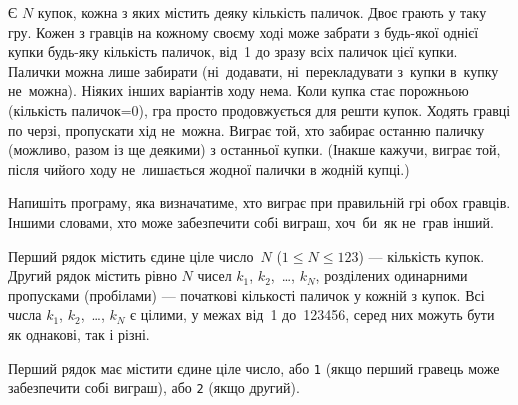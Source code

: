﻿Є $N$ купок, кожна з яких містить деяку кількість паличок.
Двоє грають у таку гру.
Кожен з гравців на кожному своєму ході може забрати з будь-якої однієї купки будь-яку кількість паличок, від~1 до зразу всіх паличок цієї купки. Палички можна лише забирати (ні~додавати, ні~перекладувати з~купки в~купку не~можна).
Ніяких інших варіантів ходу нема. 
Коли купка стає порожньою (кількість паличок=0), гра просто продовжується для решти купок.
Ходять гравці по черзі, пропускати хід не~можна.
Виграє той, хто забирає останню паличку (можливо, разом із ще деякими) з останньої купки.
(Інакше кажучи, виграє той, після чийого ходу не~лишається жодної палички в жодній купці.)

Напишіть програму, яка визначатиме, хто виграє при правильній грі обох гравців. 
Іншими словами, хто може забезпечити собі виграш, хоч~би~як не~грав інший.

\InputFile
Перший рядок містить єдине ціле число~$N$ ($1\leqslant N\leqslant 123$) --- кількість купок.
Др{\it у}гий рядок містить рівно $N$ чисел $k_1$, $k_2$,~\dots, $k_N$, розділених одинарними пропусками (пробілами) --- початкові кількості паличок у кожній з купок. Всі ч{\it и}сла $k_1$, $k_2$,~\dots, $k_N$ є цілими, у межах від~1 до~123456, серед них можуть бути як однакові, так і різні.

\OutputFile
Перший рядок має містити єдине ціле число, або \texttt{1} (якщо перший гравець може забезпечити собі виграш), або \texttt{2} (якщо др{\it у}гий).

\Examples

\begin{example}
%
\end{example}
